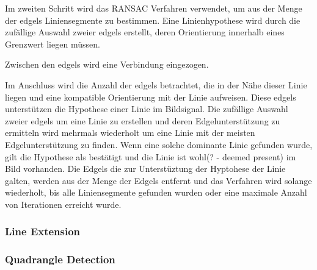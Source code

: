 Im zweiten Schritt wird das RANSAC Verfahren verwendet, um aus der Menge der \gls{edgels} Liniensegmente zu bestimmen. Eine Linienhypothese wird durch die zufällige Auswahl zweier \gls{edgels} erstellt, deren Orientierung innerhalb eines Grenzwert liegen müssen.

Zwischen den \gls{edgels} wird eine Verbindung eingezogen.

Im Anschluss wird die Anzahl der \gls{edgels} betrachtet, die in der Nähe dieser Linie liegen und eine kompatible Orientierung mit der Linie aufweisen. Diese \gls{edgels} unterstützen die Hypothese einer Linie im Bildsignal. Die zufällige Auswahl zweier \gls{edgels} um eine Linie zu erstellen und deren Edgelunterstützung zu ermitteln wird mehrmals wiederholt um eine Linie mit der meisten Edgelunterstützung zu finden. Wenn eine solche dominante Linie gefunden wurde, gilt die Hypothese als bestätigt und die Linie ist wohl(? - deemed present) im Bild vorhanden. Die Edgels die zur Unterstüztung der Hyptohese der Linie galten, werden aus der Menge der Edgels entfernt und das Verfahren wird solange wiederholt, bis alle Liniensegmente gefunden wurden oder eine maximale Anzahl von Iterationen erreicht wurde.



\subsubsection{Line Extension} %
\label{sub:line_extension}

\subsubsection{Quadrangle Detection} %
\label{sub:quadrangle_detection}

